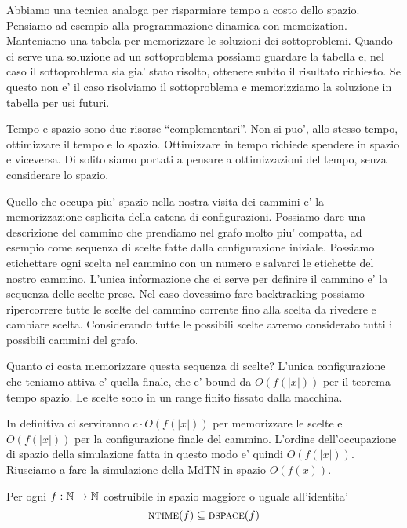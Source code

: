 Abbiamo una tecnica analoga per risparmiare tempo a costo dello spazio. Pensiamo ad esempio alla
programmazione dinamica con memoization. Manteniamo una tabela per memorizzare le soluzioni dei
sottoproblemi. Quando ci serve una soluzione ad un sottoproblema possiamo guardare la tabella e, nel
caso il sottoproblema sia gia' stato risolto, ottenere subito il risultato richiesto. Se questo non
e' il caso risolviamo il sottoproblema e memorizziamo la soluzione in tabella per usi futuri.

Tempo e spazio sono due risorse ``complementari''. Non si puo', allo stesso tempo, ottimizzare il
tempo e lo spazio. Ottimizzare in tempo richiede spendere in spazio e viceversa.  Di solito siamo
portati a pensare a ottimizzazioni del tempo, senza considerare lo spazio.

Quello che occupa piu' spazio nella nostra visita dei cammini e' la memorizzazione esplicita della
catena di configurazioni. Possiamo dare una descrizione del cammino che prendiamo nel grafo molto
piu' compatta, ad esempio come sequenza di scelte fatte dalla configurazione iniziale. Possiamo
etichettare ogni scelta nel cammino con un numero e salvarci le etichette del nostro cammino.
L'unica informazione che ci serve per definire il cammino e' la sequenza delle scelte prese. Nel
caso dovessimo fare backtracking possiamo ripercorrere tutte le scelte del cammino corrente fino
alla scelta da rivedere e cambiare scelta. Considerando tutte le possibili scelte avremo considerato
tutti i possibili cammini del grafo.

Quanto ci costa memorizzare questa sequenza di scelte? L'unica configurazione che teniamo attiva e'
quella finale, che e' bound da $O(f(|x|))$ per il teorema tempo spazio. Le scelte sono in un range
finito fissato dalla macchina.

In definitiva ci serviranno $c\cdot O(f(|x|))$ per memorizzare le scelte e $O(f(|x|))$ per la
configurazione finale del cammino. L'ordine dell'occupazione di spazio della simulazione fatta in
questo modo e' quindi $O(f(|x|))$. Riusciamo a fare la simulazione della MdTN in spazio $O(f(x))$.

\begin{thm}
    Per ogni $f:\mathbb{N} \to \mathbb{N}$ costruibile in spazio maggiore o uguale all'identita'
    \begin{equation*}
        \textsc{ntime}(f) \subseteq \textsc{dspace}(f)
    \end{equation*}
\end{thm}

